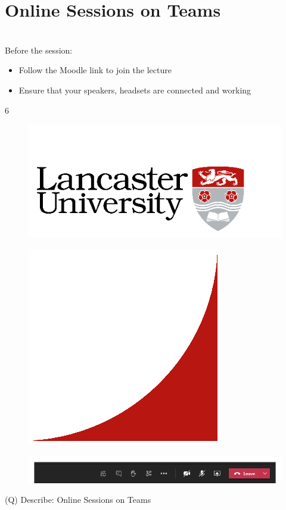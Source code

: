 \documentclass[12pt]{article}
\begin{document}
\section{Online Sessions on Teams}
\\
Before the session:\\
\begin{itemize}
  \item Follow the Moodle link to join the lecture
  \item Ensure that your speakers, headsets are connected and working
\end{itemize}
6\\
\begin{figure}[H]
\includegraphics[width=0.5\linewidth]{page6-image-1.png}
\end{figure}
\begin{figure}[H]
\includegraphics[width=0.5\linewidth]{page6-image-2.png}
\end{figure}
\begin{figure}[H]
\includegraphics[width=0.5\linewidth]{page6-image-3.png}
\end{figure}
\clearpage
(Q)
Describe: Online Sessions on Teams
\clearpage
\end{document}
